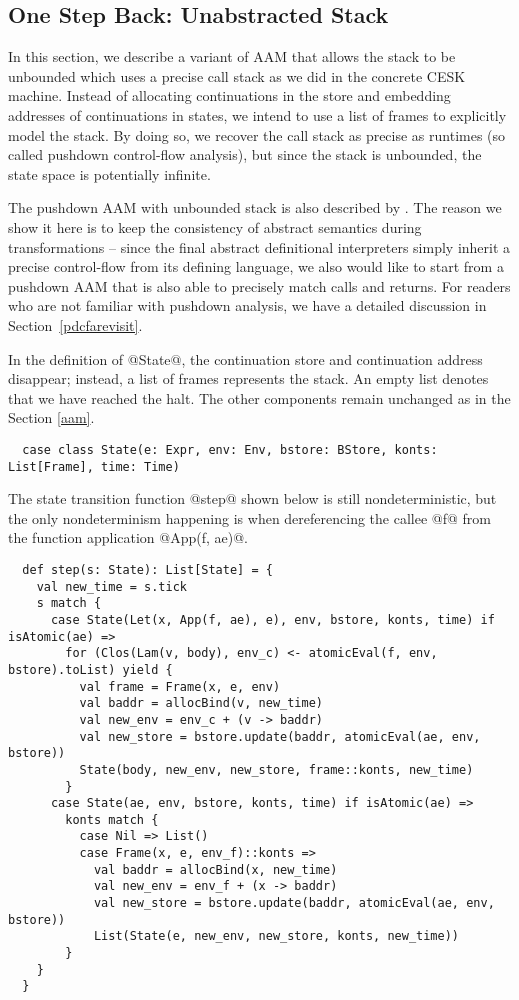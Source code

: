 \documentclass[acmsmall, review]{acmart}\settopmatter{}
\begin{document}
\subsection{One Step Back: Unabstracted Stack} \label{unabs}

In this section, we describe a variant of AAM that allows the stack to be
unbounded which uses a precise call stack as we did in the concrete CESK machine.
Instead of allocating continuations in the store and embedding addresses of 
continuations in states, we intend to use a list of frames to explicitly model 
the stack. By doing so, we recover the call stack as precise as runtimes
(so called pushdown control-flow analysis), but since the stack is unbounded, 
the state space is potentially infinite. 

The pushdown AAM with unbounded stack is also described by \citeauthor{van2012systematic} 
\cite{van2012systematic}. 
The reason we show it here is to keep the consistency of abstract semantics during 
transformations -- since the final abstract definitional interpreters simply inherit
a precise control-flow from its defining language, we also would like to start from a
pushdown AAM that is also able to precisely match calls and returns.
For readers who are not familiar with pushdown analysis, we have a detailed discussion 
in Section~\ref{pdcfarevisit}.

In the definition of @State@, the continuation store and continuation address disappear;
instead, a list of frames represents the stack. An empty list denotes that we have reached 
the halt. The other components remain unchanged as in the Section \ref{aam}.

\begin{lstlisting}
  case class State(e: Expr, env: Env, bstore: BStore, konts: List[Frame], time: Time)
\end{lstlisting}

The state transition function @step@ shown below is still nondeterministic, but the only 
nondeterminism happening is when dereferencing the callee @f@ from the function application 
@App(f, ae)@.

\begin{lstlisting}
  def step(s: State): List[State] = {
    val new_time = s.tick
    s match {
      case State(Let(x, App(f, ae), e), env, bstore, konts, time) if isAtomic(ae) =>
        for (Clos(Lam(v, body), env_c) <- atomicEval(f, env, bstore).toList) yield {
          val frame = Frame(x, e, env)
          val baddr = allocBind(v, new_time)
          val new_env = env_c + (v -> baddr)
          val new_store = bstore.update(baddr, atomicEval(ae, env, bstore))
          State(body, new_env, new_store, frame::konts, new_time)
        }
      case State(ae, env, bstore, konts, time) if isAtomic(ae) =>
        konts match {
          case Nil => List()
          case Frame(x, e, env_f)::konts =>
            val baddr = allocBind(x, new_time)
            val new_env = env_f + (x -> baddr)
            val new_store = bstore.update(baddr, atomicEval(ae, env, bstore))
            List(State(e, new_env, new_store, konts, new_time))
        }
    }
  }
\end{lstlisting}
\end{document}
